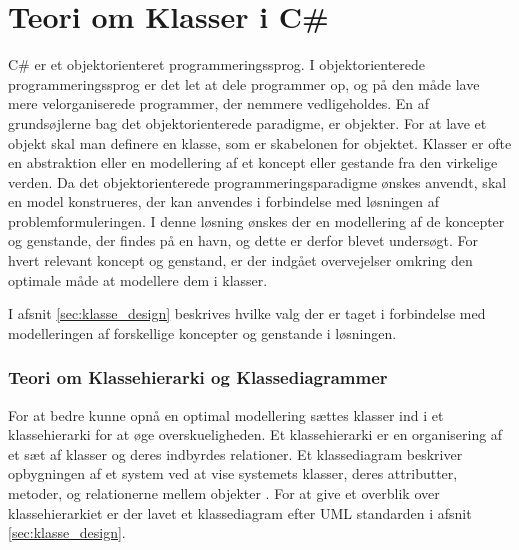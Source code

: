 \section{Teori om Klasser i C\#}
\label{sec:klasse_teori}

C\# er et objektorienteret programmeringssprog. I objektorienterede programmeringssprog er det let at dele programmer op, og på den måde lave mere velorganiserede programmer, der nemmere vedligeholdes. En af grundsøjlerne bag det objektorienterede paradigme, er objekter. For at lave et objekt skal man definere en klasse, som er skabelonen for objektet. Klasser er ofte en abstraktion eller en modellering af et koncept eller gestande fra den virkelige verden. Da det objektorienterede programmeringsparadigme ønskes anvendt, skal en model konstrueres, der kan anvendes i forbindelse med løsningen af problemformuleringen. I denne løsning ønskes der en modellering af de koncepter og genstande, der findes på en havn, og dette er derfor blevet undersøgt. For hvert relevant koncept og genstand, er der indgået overvejelser omkring den optimale måde at modellere dem i klasser.

I afsnit \cref{sec:klasse_design} beskrives hvilke valg der er taget i forbindelse med modelleringen af forskellige koncepter og genstande i løsningen.

\subsubsection{Teori om Klassehierarki og Klassediagrammer}
\label{sub:uml_teori}

For at bedre kunne opnå en optimal modellering sættes klasser ind i et klassehierarki for at øge overskueligheden. Et klassehierarki er en organisering af et sæt af klasser og deres indbyrdes relationer. Et klassediagram beskriver opbygningen af et system ved at vise systemets klasser, deres attributter, metoder, og relationerne mellem objekter \cite{martin2006agile}. For at give et overblik over klassehierarkiet er der lavet et klassediagram efter UML standarden i afsnit \cref{sec:klasse_design}.

